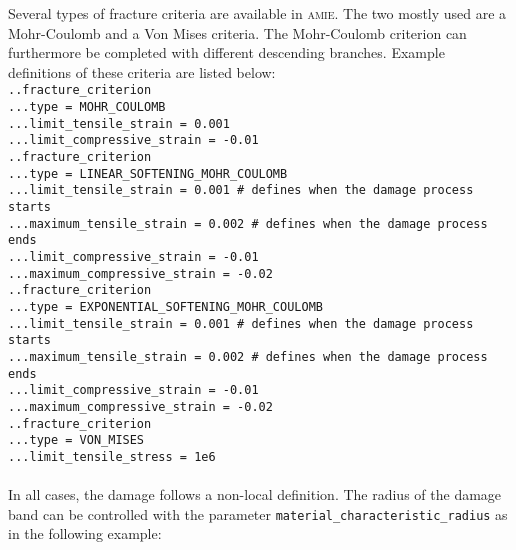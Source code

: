 \documentclass[10pt]{article}
\begin{document}
Several types of fracture criteria are available in \textsc{amie}. The two mostly used are a Mohr-Coulomb and a Von Mises criteria. The Mohr-Coulomb criterion can furthermore be completed with different descending branches. Example definitions of these criteria are listed below:\\

\noindent \verb+..fracture_criterion+\\
\verb+...type = MOHR_COULOMB+\\
\verb+...limit_tensile_strain = 0.001+\\
\verb+...limit_compressive_strain = -0.01+\\

\noindent \verb+..fracture_criterion+\\
\verb+...type = LINEAR_SOFTENING_MOHR_COULOMB+\\
\verb+...limit_tensile_strain = 0.001 # defines when the damage process starts+\\
\verb+...maximum_tensile_strain = 0.002 # defines when the damage process ends+\\
\verb+...limit_compressive_strain = -0.01+\\
\verb+...maximum_compressive_strain = -0.02+\\

\noindent \verb+..fracture_criterion+\\
\verb+...type = EXPONENTIAL_SOFTENING_MOHR_COULOMB+\\
\verb+...limit_tensile_strain = 0.001 # defines when the damage process starts+\\
\verb+...maximum_tensile_strain = 0.002 # defines when the damage process ends+\\
\verb+...limit_compressive_strain = -0.01+\\
\verb+...maximum_compressive_strain = -0.02+\\

\noindent \verb+..fracture_criterion+\\
\verb+...type = VON_MISES+\\
\verb+...limit_tensile_stress = 1e6+

\paragraph{} In all cases, the damage follows a non-local definition. The radius of the damage band can be controlled with the parameter \verb+material_characteristic_radius+ as in the following example:\\
\end{document}
